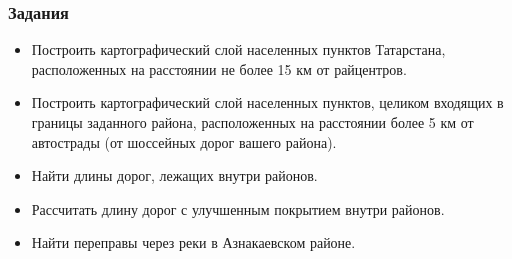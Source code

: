 
\begin{frame}
    \frametitle{Задания}
    \begin{itemize}
        \item Построить картографический слой населенных пунктов Татарстана, расположенных на расстоянии не более 15 км от райцентров.
        \item Построить картографический слой населенных пунктов, целиком входящих в границы заданного района, расположенных на расстоянии более 5 км от автострады (от шоссейных дорог вашего района).
        \item Найти длины дорог, лежащих внутри районов. %
        \item Рассчитать длину дорог с улучшенным покрытием внутри районов.
        \item Найти переправы через реки в Азнакаевском районе.
    \end{itemize}
\end{frame}
